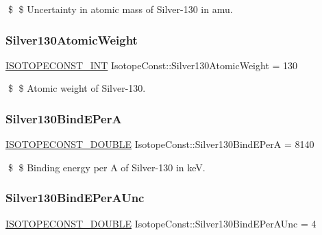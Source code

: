 \$ \$ Uncertainty in atomic mass of Silver-\/130 in amu. \mbox{\label{group___isotope_const-_silver-_ag130_gae29b6a7e05c0c60724b890da9b0f4593}} 
\subsubsection{\texorpdfstring{Silver130\+Atomic\+Weight}{Silver130AtomicWeight}}
{\footnotesize\ttfamily \mbox{\hyperlink{group___isotope_const-_macros_ga5f18360b3e99483a35c32d789e62621c}{I\+S\+O\+T\+O\+P\+E\+C\+O\+N\+S\+T\+\_\+\+I\+NT}} Isotope\+Const\+::\+Silver130\+Atomic\+Weight = 130}

\$ \$ Atomic weight of Silver-\/130. \mbox{\label{group___isotope_const-_silver-_ag130_ga54ec14846bc65e5b5957b33256a5b30d}} 
\subsubsection{\texorpdfstring{Silver130\+Bind\+E\+PerA}{Silver130BindEPerA}}
{\footnotesize\ttfamily \mbox{\hyperlink{group___isotope_const-_macros_ga8f45a7272ce02c0b4c65c44636ed719a}{I\+S\+O\+T\+O\+P\+E\+C\+O\+N\+S\+T\+\_\+\+D\+O\+U\+B\+LE}} Isotope\+Const\+::\+Silver130\+Bind\+E\+PerA = 8140}

\$ \$ Binding energy per A of Silver-\/130 in keV. \mbox{\label{group___isotope_const-_silver-_ag130_gabb47e404ade50e95be3502fe74cb744b}} 
\subsubsection{\texorpdfstring{Silver130\+Bind\+E\+Per\+A\+Unc}{Silver130BindEPerAUnc}}
{\footnotesize\ttfamily \mbox{\hyperlink{group___isotope_const-_macros_ga8f45a7272ce02c0b4c65c44636ed719a}{I\+S\+O\+T\+O\+P\+E\+C\+O\+N\+S\+T\+\_\+\+D\+O\+U\+B\+LE}} Isotope\+Const\+::\+Silver130\+Bind\+E\+Per\+A\+Unc = 4}

